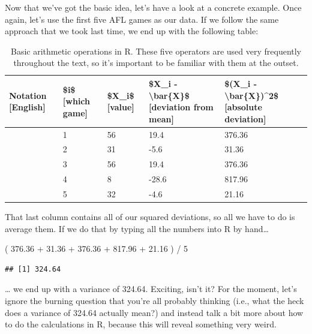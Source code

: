 \documentclass[
]{book}
\newenvironment{Shaded}{\begin{snugshade}}{\end{snugshade}}
\newcommand{\DecValTok}[1]{\textcolor[rgb]{0.00,0.00,0.81}{#1}}
\newcommand{\FloatTok}[1]{\textcolor[rgb]{0.00,0.00,0.81}{#1}}
\newcommand{\NormalTok}[1]{#1}
\newcommand{\SpecialCharTok}[1]{\textcolor[rgb]{0.00,0.00,0.00}{#1}}
\begin{document}
Now that we've got the basic idea, let's have a look at a concrete example. Once again, let's use the first five AFL games as our data. If we follow the same approach that we took last time, we end up with the following table:

\begin{table}

\caption{\label{tab:unnamed-chunk-194}Basic arithmetic operations in R. These five operators are used very frequently throughout the text, so it's important to be familiar with them at the outset.}
\centering
\begin{tabular}[t]{lllll}
\toprule
Notation [English] & \$i\$ [which game] & \$X\_i\$ [value] & \$X\_i - \textbackslash{}bar\{X\}\$ [deviation from mean] & \$(X\_i - \textbackslash{}bar\{X\})\textasciicircum{}2\$ [absolute deviation]\\
\midrule
 & 1 & 56 & 19.4 & 376.36\\
 & 2 & 31 & -5.6 & 31.36\\
 & 3 & 56 & 19.4 & 376.36\\
 & 4 & 8 & -28.6 & 817.96\\
 & 5 & 32 & -4.6 & 21.16\\
\bottomrule
\end{tabular}
\end{table}

That last column contains all of our squared deviations, so all we have to do is average them. If we do that by typing all the numbers into R by hand\ldots{}

\begin{Shaded}
\begin{Highlighting}[]
\NormalTok{( }\FloatTok{376.36} \SpecialCharTok{+} \FloatTok{31.36} \SpecialCharTok{+} \FloatTok{376.36} \SpecialCharTok{+} \FloatTok{817.96} \SpecialCharTok{+} \FloatTok{21.16}\NormalTok{ ) }\SpecialCharTok{/} \DecValTok{5}
\end{Highlighting}
\end{Shaded}

\begin{verbatim}
## [1] 324.64
\end{verbatim}

\ldots{} we end up with a variance of 324.64. Exciting, isn't it? For the moment, let's ignore the burning question that you're all probably thinking (i.e., what the heck does a variance of 324.64 actually mean?) and instead talk a bit more about how to do the calculations in R, because this will reveal something very weird.
\end{document}
